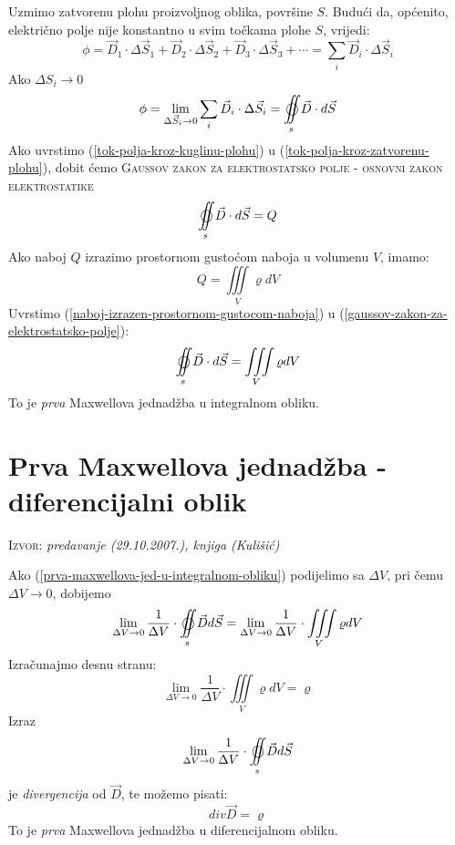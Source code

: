 \documentclass{report}
\begin{document}
Uzmimo zatvorenu plohu proizvoljnog oblika, površine $S$. Budući da, općenito, električno polje nije konstantno u svim točkama plohe $S$, vrijedi:
$$\phi = \vec{D} _1 \cdot \Delta \vec{S} _1 + \vec{D} _2 \cdot \Delta \vec{S} _2 + \vec{D} _3 \cdot \Delta \vec{S} _3 + \cdots = \sum\limits_i {\vec D_i  \cdot \Delta \vec S_i } $$
Ako $\Delta S _i \to 0$
\begin{equation}
	\phi = \mathop {\lim }\limits_{\Delta \vec{S} _i \to 0 } \sum\limits_i {\vec D_i  \cdot \Delta \vec S_i } = \mathop{{\int\!\!\!\!\!\int}\mkern-21mu \bigcirc}\limits_s {\vec D \cdot d\vec S}
	\label{tok-polja-kroz-zatvorenu-plohu}
\end{equation}
Ako uvrstimo (\ref{tok-polja-kroz-kuglinu-plohu}) u (\ref{tok-polja-kroz-zatvorenu-plohu}), dobit ćemo \textsc{Gaussov zakon za elektrostatsko polje - osnovni zakon elektrostatike}
\begin{equation}
	\mathop{{\int\!\!\!\!\!\int}\mkern-21mu \bigcirc}\limits_s {\vec D \cdot d\vec S}  = Q
	\label{gaussov-zakon-za-elektrostatsko-polje}
\end{equation}
Ako naboj $Q$ izrazimo prostornom gustoćom naboja u volumenu $V$, imamo:
\begin{equation}
	Q = \iiint\limits_V {\varrho dV}
	\label{naboj-izrazen-prostornom-gustocom-naboja}
\end{equation}
Uvrstimo (\ref{naboj-izrazen-prostornom-gustocom-naboja}) u (\ref{gaussov-zakon-za-elektrostatsko-polje}):
\begin{equation}
	\mathop{{\int\!\!\!\!\!\int}\mkern-21mu \bigcirc}\limits_s {\vec D \cdot d\vec S}  = \iiint\limits_V {\varrho dV}
	\label{prva-maxwellova-jed-u-integralnom-obliku}
\end{equation}
To je \textit{prva} Maxwellova jednadžba u integralnom obliku.

\section{Prva Maxwellova jednadžba - diferencijalni oblik}
\small \textsc{Izvor:} \textit{predavanje (29.10.2007.), knjiga (Kulišić)}

Ako (\ref{prva-maxwellova-jed-u-integralnom-obliku}) podijelimo sa $\Delta V$, pri čemu $\Delta V \to 0$, dobijemo
$$\mathop {\lim }\limits_{\Delta V \to 0} \frac{1}
{{\Delta V}} \cdot \mathop{{\int\!\!\!\!\!\int}\mkern-21mu \bigcirc}\limits_s 
 {\vec Dd\vec S}  = \mathop {\lim }\limits_{\Delta V \to 0} \frac{1}
{{\Delta V}} \cdot \iiint\limits_V {\varrho dV}$$
Izračunajmo desnu stranu:
$$\mathop {\lim }\limits_{\Delta V \to 0} \frac{1}
{{\Delta V}} \cdot \iiint\limits_V {\varrho dV} = \varrho $$
Izraz
$$\mathop {\lim }\limits_{\Delta V \to 0} \frac{1}
{{\Delta V}} \cdot \mathop{{\int\!\!\!\!\!\int}\mkern-21mu \bigcirc}\limits_s 
 {\vec Dd\vec S} $$
je \textit{divergencija} od $\vec{D}$, te možemo pisati:
\begin{equation}
	div \vec{D} = \varrho 
	\label{prva-maxwellova-jed-u-diferencijalnom-obliku}
\end{equation}
To je \textit{prva} Maxwellova jednadžba u diferencijalnom obliku.
\end{document}
